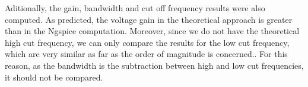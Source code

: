 \par Aditionally, the gain, bandwidth and cut off frequency results were also computed. As predicted, the voltage gain in the theoretical approach is greater than in the Ngspice computation. Moreover, since we do not have the theoretical high cut frequency, we can only compare the results for the low cut frequency, which are very similar as far as the order of magnitude is concerned.. For this reason, as the bandwidth is the subtraction between high and low cut frequencies, it should not be compared.

\clearpage











